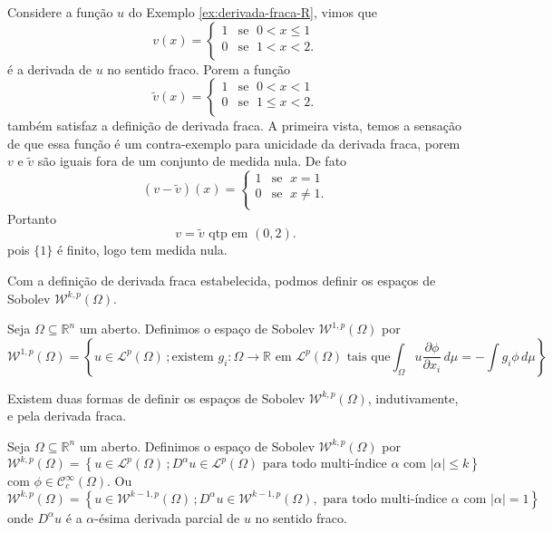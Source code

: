 \documentclass[a4paper, 11pt]{book}
\theoremstyle{definition}
\newcommand{\bR}{\mathbb{R}}
\newcommand{\cC}{\mathcal{C}}
\newcommand{\cL}{\mathcal{L}}
\newcommand{\cW}{\mathcal{W}}
\begin{document}
\begin{ex}
    Considere a função $u$ do Exemplo \ref{ex:derivada-fraca-R}, vimos que
    \[
        v(x) = \left\{
            \begin{array}{rl}
                1 & \text{se }\; 0 < x \leqslant 1\\
                0 & \text{se }\; 1 < x < 2.\\
            \end{array}
        \right.
    \]
    é a derivada de $u$ no sentido fraco.
    Porem a função
    \[
        \tilde v(x) = \left\{
            \begin{array}{rl}
                1 & \text{se }\; 0 < x < 1\\
                0 & \text{se }\; 1 \leqslant x < 2.\\
            \end{array}
        \right.
    \]
    também satisfaz a definição de derivada fraca.
    A primeira vista, temos a sensação de que essa função é um contra-exemplo para unicidade da derivada fraca, porem $v$ e $\tilde v$ são iguais fora de um conjunto de medida nula.
    De fato
    \[
        (v - \tilde v)(x) = \left\{
            \begin{array}{rl}
                1 & \text{se }\; x = 1\\
                0 & \text{se }\; x \neq 1.\\
            \end{array}
        \right.
    \]
    Portanto
    \[
        v = \tilde v \text{ qtp em } (0,2).
    \]
    pois $\{1\}$ é finito, logo tem medida nula.
\end{ex}

Com a definição de derivada fraca estabelecida, podmos definir os espaços de Sobolev $\cW^{k,p}(\Omega)$.

\begin{dbox}
    Seja $\Omega \subseteq \bR^n$ um aberto. 
    Definimos o espaço de Sobolev $\cW^{1,p}(\Omega)$ por
    \[
        \cW^{1,p}(\Omega) = \left\{u \in \cL^p(\Omega) \,; \text{existem } g_i : \Omega \to \bR \text{ em $\cL^p(\Omega)$ tais que} \int_\Omega u \dfrac{\partial \phi}{\partial x_i} \, d\mu = -\!\!\int g_i \phi \,d\mu \right\}
    \]
\end{dbox}

Existem duas formas de definir os espaços de Sobolev $\cW^{k,p}(\Omega)$, indutivamente, e pela derivada fraca.

\begin{dbox}
    Seja $\Omega \subseteq \bR ^n$ um aberto. Definimos o espaço de Sobolev $\cW^{k,p}(\Omega)$ por
    \[
        \cW^{k,p}(\Omega) = \left\{ u \in \cL^p(\Omega) \,; D^\alpha u \in \cL^p(\Omega) \text{ para todo multi-índice } \alpha \text{ com } |\alpha| \leqslant k\right\}
    \]
    com $\phi \in \cC^\infty_c(\Omega)$. 
    Ou
    \[
        \cW^{k,p}(\Omega) = \left\{ u \in \cW^{k-1,p}(\Omega) \,; D^\alpha u \in \cW^{k-1,p}(\Omega) , \text{ para todo multi-índice } \alpha \text{ com } |\alpha| = 1\right\}
    \]
    onde $D^\alpha u$ é a $\alpha$-ésima derivada parcial de $u$ no sentido fraco.
\end{dbox}
\end{document}
